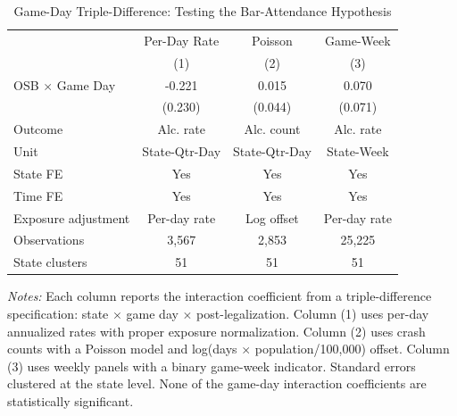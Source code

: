 \begin{table}[t]
\centering
\caption{Game-Day Triple-Difference: Testing the Bar-Attendance Hypothesis}
\label{tab:gameday}
\begin{tabular}{lccc}
\toprule
 & Per-Day Rate & Poisson & Game-Week \\
 & (1) & (2) & (3) \\
\midrule
OSB $\times$ Game Day & -0.221 & 0.015 & 0.070 \\
 & (0.230) & (0.044) & (0.071) \\
\midrule
Outcome & Alc. rate & Alc. count & Alc. rate \\
Unit & State-Qtr-Day & State-Qtr-Day & State-Week \\
State FE & Yes & Yes & Yes \\
Time FE & Yes & Yes & Yes \\
Exposure adjustment & Per-day rate & Log offset & Per-day rate \\
Observations & 3,567 & 2,853 & 25,225 \\
State clusters & 51 & 51 & 51 \\
\bottomrule
\end{tabular}
\begin{tablenotes}
\small
\item \textit{Notes:} Each column reports the interaction coefficient from a triple-difference specification: state $\times$ game day $\times$ post-legalization. Column (1) uses per-day annualized rates with proper exposure normalization. Column (2) uses crash counts with a Poisson model and log(days $\times$ population/100,000) offset. Column (3) uses weekly panels with a binary game-week indicator. Standard errors clustered at the state level. None of the game-day interaction coefficients are statistically significant.
\end{tablenotes}
\end{table}

